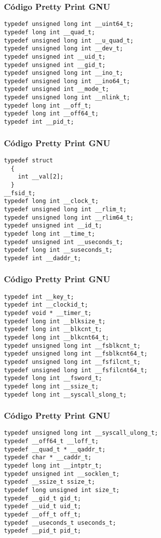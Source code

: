 \documentclass{beamer}
\begin{document}
\begin{frame}[fragile]
\frametitle{C\'odigo Pretty Print GNU}
\begin{verbatim}
typedef unsigned long int __uint64_t;
typedef long int __quad_t;
typedef unsigned long int __u_quad_t;
typedef unsigned long int __dev_t;
typedef unsigned int __uid_t;
typedef unsigned int __gid_t;
typedef unsigned long int __ino_t;
typedef unsigned long int __ino64_t;
typedef unsigned int __mode_t;
typedef unsigned long int __nlink_t;
typedef long int __off_t;
typedef long int __off64_t;
typedef int __pid_t;
\end{verbatim}
\end{frame}
\begin{frame}[fragile]
\frametitle{C\'odigo Pretty Print GNU}
\begin{verbatim}
typedef struct
  {
    int __val[2];
  }
__fsid_t;
typedef long int __clock_t;
typedef unsigned long int __rlim_t;
typedef unsigned long int __rlim64_t;
typedef unsigned int __id_t;
typedef long int __time_t;
typedef unsigned int __useconds_t;
typedef long int __suseconds_t;
typedef int __daddr_t;
\end{verbatim}
\end{frame}
\begin{frame}[fragile]
\frametitle{C\'odigo Pretty Print GNU}
\begin{verbatim}
typedef int __key_t;
typedef int __clockid_t;
typedef void * __timer_t;
typedef long int __blksize_t;
typedef long int __blkcnt_t;
typedef long int __blkcnt64_t;
typedef unsigned long int __fsblkcnt_t;
typedef unsigned long int __fsblkcnt64_t;
typedef unsigned long int __fsfilcnt_t;
typedef unsigned long int __fsfilcnt64_t;
typedef long int __fsword_t;
typedef long int __ssize_t;
typedef long int __syscall_slong_t;
\end{verbatim}
\end{frame}
\begin{frame}[fragile]
\frametitle{C\'odigo Pretty Print GNU}
\begin{verbatim}
typedef unsigned long int __syscall_ulong_t;
typedef __off64_t __loff_t;
typedef __quad_t * __qaddr_t;
typedef char * __caddr_t;
typedef long int __intptr_t;
typedef unsigned int __socklen_t;
typedef __ssize_t ssize_t;
typedef long unsigned int size_t;
typedef __gid_t gid_t;
typedef __uid_t uid_t;
typedef __off_t off_t;
typedef __useconds_t useconds_t;
typedef __pid_t pid_t;
\end{verbatim}
\end{frame}
\end{document}
